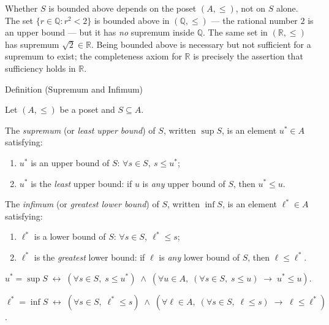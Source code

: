 \begin{remark*}
\label{rem:bounds-ambient}
Whether $S$ is bounded above depends on the poset $(A, \leq)$, not on
$S$ alone.  The set $\{r \in \mathbb{Q} : r^2 < 2\}$ is bounded above in
$(\mathbb{Q}, \leq)$ — the rational number $2$ is an upper bound — but
it has \emph{no} supremum inside $\mathbb{Q}$.  The same set in
$(\mathbb{R}, \leq)$ has supremum $\sqrt{2} \in \mathbb{R}$.  Being
bounded above is necessary but not sufficient for a supremum to exist;
the completeness axiom for $\mathbb{R}$ is precisely the assertion that
sufficiency holds in $\mathbb{R}$.
\end{remark*}


\begin{definitionbox}{Definition (Supremum and Infimum)}
\begin{definition}\label{def:sup-inf}
Let $(A, \leq)$ be a poset and $S \subseteq A$.

The \emph{supremum} (or \emph{least upper bound}) of $S$, written
$\sup S$, is an element $u^* \in A$ satisfying:
\begin{enumerate}[label=(\roman*)]
  \item $u^*$ is an upper bound of $S$: $\forall s \in S,\ s \leq u^*$;
  \item $u^*$ is the \emph{least} upper bound: if $u$ is \emph{any}
        upper bound of $S$, then $u^* \leq u$.
\end{enumerate}

The \emph{infimum} (or \emph{greatest lower bound}) of $S$, written
$\inf S$, is an element $\ell^* \in A$ satisfying:
\begin{enumerate}[label=(\roman*)]
  \item $\ell^*$ is a lower bound of $S$: $\forall s \in S,\ \ell^* \leq s$;
  \item $\ell^*$ is the \emph{greatest} lower bound: if $\ell$ is \emph{any}
        lower bound of $S$, then $\ell \leq \ell^*$.
\end{enumerate}
\end{definition}
\end{definitionbox}

\begin{remark*}
$u^* = \sup S \;\leftrightarrow\; (\forall s \in S,\; s \leq u^*) \;\wedge\;
(\forall u \in A,\; (\forall s \in S,\; s \leq u) \;\rightarrow\; u^* \leq u)$.

$\ell^* = \inf S \;\leftrightarrow\; (\forall s \in S,\; \ell^* \leq s) \;\wedge\;
(\forall \ell \in A,\; (\forall s \in S,\; \ell \leq s) \;\rightarrow\; \ell \leq \ell^*)$.
\end{remark*}

